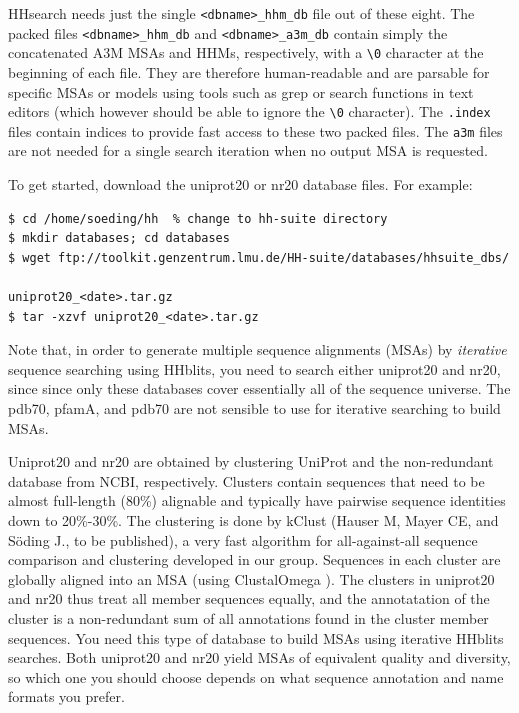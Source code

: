 \documentclass[11pt,a4paper]{article}
\begin{document}
HHsearch needs just the single \verb`<dbname>_hhm_db` file out of these eight. The packed files \verb`<dbname>_hhm_db` and \verb`<dbname>_a3m_db` contain simply the concatenated A3M MSAs and HHMs, respectively, with a \verb`\0` character at the beginning of each file. They are therefore human-readable and are parsable for specific MSAs or models using tools such as grep or search functions in text editors (which however should be able to ignore the \verb`\0` character). The \verb`.index` files contain indices to provide fast access to these two packed files. The \verb`a3m` files are not needed for a single search iteration when no output MSA is requested. 

To get started, download the uniprot20 or nr20 database files. For example:
\begin{verbatim}
$ cd /home/soeding/hh  % change to hh-suite directory
$ mkdir databases; cd databases
$ wget ftp://toolkit.genzentrum.lmu.de/HH-suite/databases/hhsuite_dbs/
                                                 uniprot20_<date>.tar.gz
$ tar -xzvf uniprot20_<date>.tar.gz
\end{verbatim}

Note that, in order to generate multiple sequence alignments (MSAs) by \emph{iterative} sequence searching using HHblits,
you need to search either uniprot20 and nr20, since since only these databases cover essentially all of the sequence 
universe. The pdb70, pfamA, and pdb70 are not sensible to use for iterative searching to build MSAs.

Uniprot20 and nr20 are obtained by clustering UniProt \cite{uniprot:2010} and the non-redundant database from NCBI, respectively. Clusters  contain sequences that need to be almost full-length (80\%) alignable and typically have pairwise sequence identities down to 20\%-30\%. The clustering is done by kClust (Hauser M, Mayer CE, and S\"oding J., to be published), a very fast algorithm for all-against-all sequence comparison and clustering developed in our group. Sequences in each cluster are globally aligned into an MSA (using ClustalOmega \cite{Higgins:2011}). The clusters in uniprot20 and nr20 thus treat all member sequences equally, and the annotatation of the cluster is a non-redundant sum of all annotations found in the cluster member sequences. You need this type of database to build MSAs using iterative HHblits searches. Both uniprot20 and nr20 yield MSAs of equivalent quality and diversity, so which one you should choose depends on what sequence annotation and name formats you prefer. 
\end{document}
